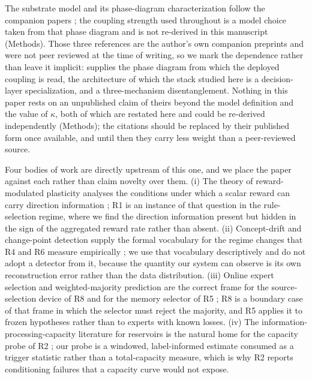 \documentclass[preprint,12pt]{elsarticle}
\begin{document}
The substrate model
and its phase-diagram characterization follow the companion papers
\cite{companionA,companionB,companionC}; the coupling strength used
throughout is a model choice taken from that phase diagram and is not
re-derived in this manuscript (Methods). Those three references are the
author's own companion preprints and were not peer reviewed at the time of
writing, so we mark the dependence rather than leave it implicit:
\cite{companionA} supplies the phase diagram from which the deployed coupling is
read, \cite{companionB} the architecture of which the stack studied here is a
decision-layer specialization, and \cite{companionC} a three-mechanism
disentanglement. Nothing in this paper rests on an unpublished claim of theirs
beyond the model definition and the value of $\kappa$, both of which are
restated here and could be re-derived independently (Methods); the citations
should be replaced by their published form once available, and until then they
carry less weight than a peer-reviewed source.

Four bodies of work are directly upstream of this one, and we place the paper
against each rather than claim novelty over them. (i) The theory of
reward-modulated plasticity analyses the conditions under which a scalar
reward can carry direction information \cite{hoerzer2014,pfister2006}; R1 is an
instance of that question in the rule-selection regime, where we find the
direction information present but hidden in the sign of the aggregated reward
rate rather than absent. (ii) Concept-drift and change-point detection supply
the formal vocabulary for the regime changes that R4 and R6 measure
empirically \cite{gama2014,truong2020}; we use that vocabulary descriptively
and do not adopt a detector from it, because the quantity our system can
observe is its own reconstruction error rather than the data distribution.
(iii) Online expert selection and weighted-majority prediction are the correct
frame for the source-selection device of R8 and for the memory selector of R5
\cite{cesabianchi2006,zinkevich2003}; R8 is a boundary case of that frame in
which the selector must reject the majority, and R5 applies it to frozen
hypotheses rather than to experts with known losses. (iv) The
information-processing-capacity literature for reservoirs is the natural home
for the capacity probe of R2 \cite{dambre2012,jaeger2004}; our probe is a
windowed, label-informed estimate consumed as a trigger statistic rather than
a total-capacity measure, which is why R2 reports conditioning failures that a
capacity curve would not expose.
\end{document}

